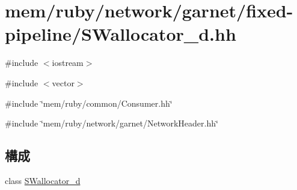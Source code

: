 \hypertarget{SWallocator__d_8hh}{
\section{mem/ruby/network/garnet/fixed-\/pipeline/SWallocator\_\-d.hh}
\label{SWallocator__d_8hh}
}
{\ttfamily \#include $<$iostream$>$}\par
{\ttfamily \#include $<$vector$>$}\par
{\ttfamily \#include \char`\"{}mem/ruby/common/Consumer.hh\char`\"{}}\par
{\ttfamily \#include \char`\"{}mem/ruby/network/garnet/NetworkHeader.hh\char`\"{}}\par
\subsection*{構成}
\begin{DoxyCompactItemize}
\item 
class \hyperlink{classSWallocator__d}{SWallocator\_\-d}
\end{DoxyCompactItemize}

